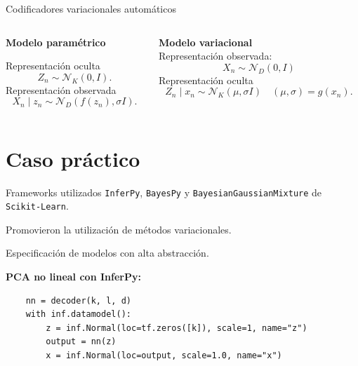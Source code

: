 \documentclass[aspectratio=169]{beamer}
\begin{document}
  \begin{frame}{Codificadores variacionales automáticos}
    \begin{columns}
      \begin{column}{0.5\textwidth}
        \textbf{Modelo paramétrico}

        Representación oculta
        \[
          Z_{n} \sim \mathcal{N}_{K}(0, I).
        \]
        Representación observada
        \[
          X_{n} \mid z_{n} \sim \mathcal{N}_{D}(f(z_{n}), \sigma I).
        \]

      \end{column}
      \begin{column}{0.5\textwidth}
        \textbf{Modelo variacional}\\
        Representación observada:
        \[
          X_{n} \sim \mathcal{N}_{D}(0, I)
        \]
        Representación oculta
        \[
          Z_{n} \mid x_{n} \sim \mathcal{N}_{K}(\mu, \sigma I) \quad (\mu, \sigma) = g(x_{n}).
        \]
      \end{column}
    \end{columns}

  \end{frame}

  \section{Caso práctico}

  \begin{frame}[fragile]{Frameworks utilizados}
    \texttt{InferPy}, \texttt{BayesPy} y \texttt{BayesianGaussianMixture} de \texttt{Scikit-Learn}.

    Promovieron la utilización de métodos variacionales.

    Especificación de modelos con alta abstracción.

    \textbf{PCA no lineal con InferPy:}
    \begin{verbatim}
    nn = decoder(k, l, d)
    with inf.datamodel():
        z = inf.Normal(loc=tf.zeros([k]), scale=1, name="z")
        output = nn(z)
        x = inf.Normal(loc=output, scale=1.0, name="x")
    \end{verbatim}
  \end{frame}
\end{document}
